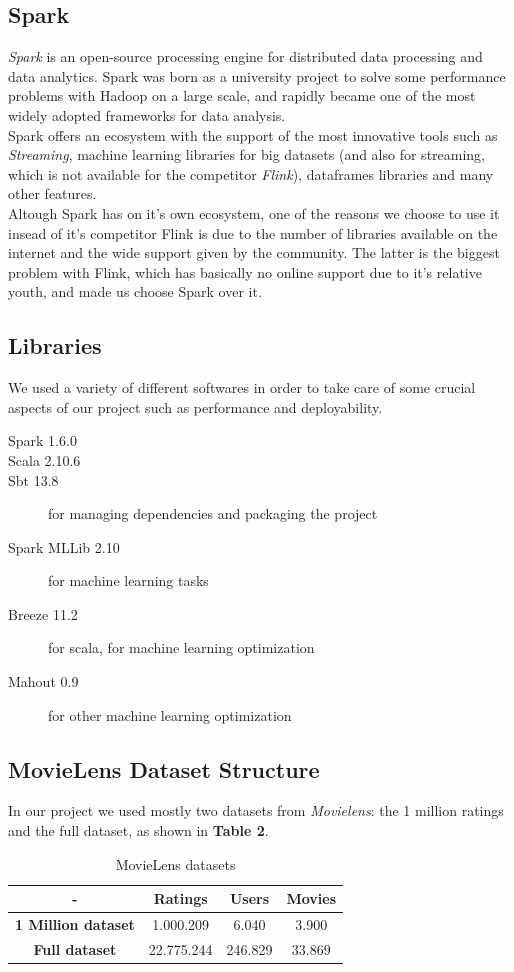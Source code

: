 \documentclass{sig-alternate-05-2015}
\begin{document}
\subsection{Spark}
\textit{Spark} is an open-source processing engine for distributed data processing
and data analytics. Spark was born as a university project to solve
some performance problems with Hadoop on a large scale, and rapidly
became one of the most widely adopted frameworks for data analysis.\\
Spark offers an ecosystem with the support of the most innovative tools
such as \textit{Streaming}, machine learning libraries for big datasets (and also
for streaming, which is not available for the competitor \textit{Flink}), dataframes
libraries and many other features.\\
Altough Spark has on it's own ecosystem, one of the reasons we choose to use it insead of it's competitor
Flink is due to the number of libraries available on the internet and the wide support given by the community.
The latter is the biggest problem with Flink, which has basically no online support due to it's relative youth, and
made us choose Spark over it.



\subsection{Libraries}
We used a variety of different softwares in order
to take care of some crucial aspects of our project such
as performance and deployability.

\begin{description}
    \item[Spark 1.6.0]
    \item[Scala 2.10.6]
    \item[Sbt 13.8] for managing dependencies and packaging the project
    \item[Spark MLLib 2.10] for machine learning tasks
    \item[Breeze 11.2] for scala, for machine learning optimization
    \item[Mahout 0.9] for other machine learning optimization

\end{description}

\subsection{MovieLens Dataset Structure}
In our project we used mostly two datasets from \textit{Movielens}: the 1 million ratings
and the full dataset, as shown in \textbf{Table 2}.
\begin{table}
\centering
\caption{MovieLens datasets}
\begin{tabular}{|c|c|c|c|} \hline
-  & \textbf{Ratings} & \textbf{Users} & \textbf{Movies}\\ \hline
\textbf{1 Million dataset} & 1.000.209 & 6.040 & 3.900 \\ \hline
\textbf{Full dataset} & 22.775.244 & 246.829 & 33.869  \\ \hline
\end{tabular}
\end{table}
\end{document}

